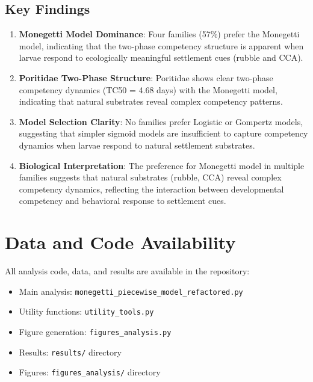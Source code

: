 \documentclass[11pt]{article}
\begin{document}
\subsection{Key Findings}

\begin{enumerate}
    \item \textbf{Monegetti Model Dominance}: Four families (57\%) prefer the Monegetti model, indicating that the two-phase competency structure is apparent when larvae respond to ecologically meaningful settlement cues (rubble and CCA).
    
    \item \textbf{Poritidae Two-Phase Structure}: Poritidae shows clear two-phase competency dynamics (TC50 = 4.68 days) with the Monegetti model, indicating that natural substrates reveal complex competency patterns.
    
    \item \textbf{Model Selection Clarity}: No families prefer Logistic or Gompertz models, suggesting that simpler sigmoid models are insufficient to capture competency dynamics when larvae respond to natural settlement substrates.
    
    \item \textbf{Biological Interpretation}: The preference for Monegetti model in multiple families suggests that natural substrates (rubble, CCA) reveal complex competency dynamics, reflecting the interaction between developmental competency and behavioral response to settlement cues.
\end{enumerate}


\section{Data and Code Availability}

All analysis code, data, and results are available in the repository:
\begin{itemize}
    \item Main analysis: \texttt{monegetti\_piecewise\_model\_refactored.py}
    \item Utility functions: \texttt{utility\_tools.py}
    \item Figure generation: \texttt{figures\_analysis.py}
    \item Results: \texttt{results/} directory
    \item Figures: \texttt{figures\_analysis/} directory
\end{itemize}
\end{document}
